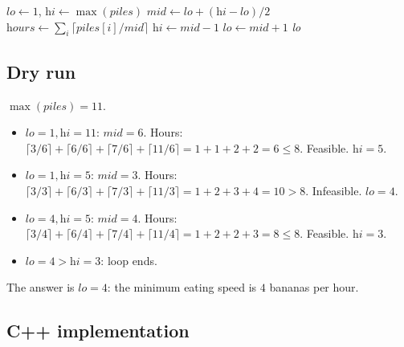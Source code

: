 \begin{algorithm}[H]
\caption{Koko Eating Bananas}
\begin{algorithmic}[1]
  \State $\textit{lo} \gets 1$, $\textit{hi} \gets \max(\textit{piles})$
    \State $\textit{mid} \gets \textit{lo}+(\textit{hi}-\textit{lo})/2$
    \State $\textit{hours} \gets \sum_i \lceil \textit{piles}[i] / \textit{mid} \rceil$
      \State $\textit{hi} \gets \textit{mid} - 1$
    \Else
      \State $\textit{lo} \gets \textit{mid} + 1$
    \EndIf
  \EndWhile
  \State \Return \textit{lo}
\EndProcedure
\end{algorithmic}
\end{algorithm}

\subsection*{Dry run}


$\max(\textit{piles}) = 11$.

\begin{itemize}
  \item $\textit{lo}=1,\textit{hi}=11$: $\textit{mid}=6$. Hours:
        $\lceil3/6\rceil+\lceil6/6\rceil+\lceil7/6\rceil+\lceil11/6\rceil
        = 1+1+2+2=6 \le 8$. Feasible. $\textit{hi}=5$.
  \item $\textit{lo}=1,\textit{hi}=5$: $\textit{mid}=3$. Hours:
        $\lceil3/3\rceil+\lceil6/3\rceil+\lceil7/3\rceil+\lceil11/3\rceil
        =1+2+3+4=10 > 8$. Infeasible. $\textit{lo}=4$.
  \item $\textit{lo}=4,\textit{hi}=5$: $\textit{mid}=4$. Hours:
        $\lceil3/4\rceil+\lceil6/4\rceil+\lceil7/4\rceil+\lceil11/4\rceil
        =1+2+2+3=8 \le 8$. Feasible. $\textit{hi}=3$.
  \item $\textit{lo}=4 > \textit{hi}=3$: loop ends.
\end{itemize}

The answer is $\textit{lo} = 4$: the minimum eating speed is $4$ bananas
per hour.

\subsection*{C++ implementation}

